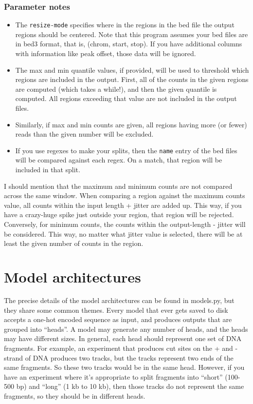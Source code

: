 \documentclass{article}
\begin{document}
\subsubsection{Parameter notes}

\begin{itemize}
    \item The \texttt{resize-mode} specifies where in the regions in the bed file the output regions should be centered. Note that this program assumes your bed files are in bed3 format, that is, (chrom, start, stop). If you have additional columns with information like peak offset, those data will be ignored. 
    \item The max and min quantile values, if provided, will be used to threshold which regions are included in the output. First, all of the counts in the given regions are computed (which takes a while!), and then the given quantile is computed. All regions exceeding that value are not included in the output files. 
    \item Similarly, if max and min counts are given, all regions having more (or fewer) reads than the given number will be excluded. 
    \item If you use regexes to make your splits, then the \texttt{name} entry of the bed files will be compared against each regex. On a match, that region will be included in that split. 
\end{itemize}

I should mention that the maximum and minimum counts are not compared across the same window. 
When comparing a region against the maximum counts value, all counts within the input length + jitter are added up. This way, if you have a crazy-huge spike just outside your region, that region will be rejected. 
Conversely, for minimum counts, the counts within the output-length - jitter will be considered. This way, no matter what jitter value is selected, there will be at least the given number of counts in the region. 

\section{Model architectures}\label{sec:modelArchitectures}

The precise details of the model architectures can be found in models.py, but they share some common themes. 
Every model that ever gets saved to disk accepts a one-hot encoded sequence as input, and produces outputs that are grouped into ``heads''. 
A model may generate any number of heads, and the heads may have different sizes. 
In general, each head should represent one set of DNA fragments. For example, an experiment that produces cut sites on the + and - strand of DNA produces
two tracks, but the tracks represent two ends of the same fragments. So these two tracks would be in the same head. 
However, if you have an experiment where it's appropriate to split fragments into ``short'' (100-500 bp) and ``long'' (1 kb to 10 kb), then 
those tracks do not represent the same fragments, so they should be in different heads. 
\end{document}
